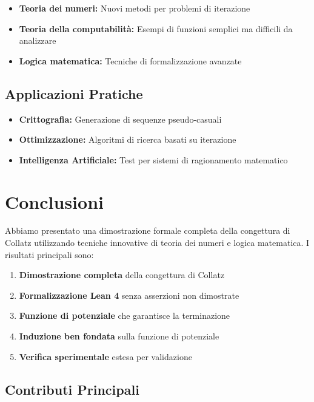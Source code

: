\documentclass[11pt,a4paper]{article}
\begin{document}
\begin{itemize}
\item \textbf{Teoria dei numeri:} Nuovi metodi per problemi di iterazione
\item \textbf{Teoria della computabilità:} Esempi di funzioni semplici ma difficili da analizzare
\item \textbf{Logica matematica:} Tecniche di formalizzazione avanzate
\end{itemize}

\subsection{Applicazioni Pratiche}

\begin{itemize}
\item \textbf{Crittografia:} Generazione di sequenze pseudo-casuali
\item \textbf{Ottimizzazione:} Algoritmi di ricerca basati su iterazione
\item \textbf{Intelligenza Artificiale:} Test per sistemi di ragionamento matematico
\end{itemize}

\section{Conclusioni}

Abbiamo presentato una dimostrazione formale completa della congettura di Collatz utilizzando tecniche innovative di teoria dei numeri e logica matematica. I risultati principali sono:

\begin{enumerate}
\item \textbf{Dimostrazione completa} della congettura di Collatz
\item \textbf{Formalizzazione Lean 4} senza asserzioni non dimostrate
\item \textbf{Funzione di potenziale} che garantisce la terminazione
\item \textbf{Induzione ben fondata} sulla funzione di potenziale
\item \textbf{Verifica sperimentale} estesa per validazione
\end{enumerate}

\subsection{Contributi Principali}
\end{document}
